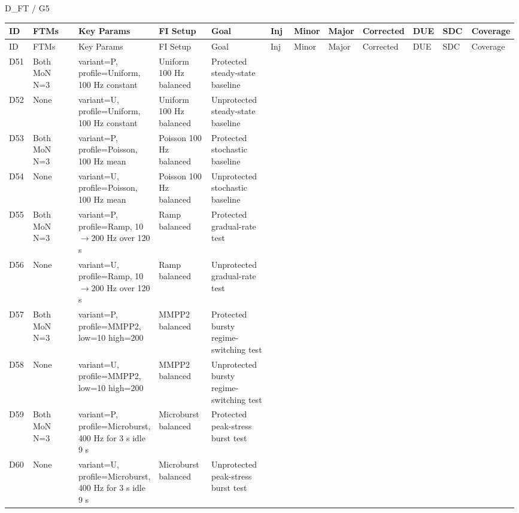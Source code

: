 D\_FT / G5

\begin{longtable}{|p{0.05\linewidth}|p{0.14\linewidth}|p{0.12\linewidth}|p{0.12\linewidth}|p{0.14\linewidth}|p{0.06\linewidth}|p{0.06\linewidth}|p{0.06\linewidth}|p{0.06\linewidth}|p{0.06\linewidth}|p{0.06\linewidth}|p{0.06\linewidth}|}
\hline
ID & FTMs & Key Params & FI Setup & Goal & Inj & Minor & Major & Corrected & DUE & SDC & Coverage \\
\hline
\endfirsthead
\hline
ID & FTMs & Key Params & FI Setup & Goal & Inj & Minor & Major & Corrected & DUE & SDC & Coverage \\
\hline
\endhead
D51 & Both MoN N=3 & variant=P, profile=Uniform, 100 Hz constant & Uniform 100 Hz \textbar{} balanced & Protected steady-state baseline &  &  &  &  &  &  &  \\
\hline
D52 & None & variant=U, profile=Uniform, 100 Hz constant & Uniform 100 Hz \textbar{} balanced & Unprotected steady-state baseline &  &  &  &  &  &  &  \\
\hline
D53 & Both MoN N=3 & variant=P, profile=Poisson, 100 Hz mean & Poisson 100 Hz \textbar{} balanced & Protected stochastic baseline &  &  &  &  &  &  &  \\
\hline
D54 & None & variant=U, profile=Poisson, 100 Hz mean & Poisson 100 Hz \textbar{} balanced & Unprotected stochastic baseline &  &  &  &  &  &  &  \\
\hline
D55 & Both MoN N=3 & variant=P, profile=Ramp, 10$\rightarrow$200 Hz over 120 s & Ramp \textbar{} balanced & Protected gradual-rate test &  &  &  &  &  &  &  \\
\hline
D56 & None & variant=U, profile=Ramp, 10$\rightarrow$200 Hz over 120 s & Ramp \textbar{} balanced & Unprotected gradual-rate test &  &  &  &  &  &  &  \\
\hline
D57 & Both MoN N=3 & variant=P, profile=MMPP2, low=10 high=200 & MMPP2 \textbar{} balanced & Protected bursty regime-switching test &  &  &  &  &  &  &  \\
\hline
D58 & None & variant=U, profile=MMPP2, low=10 high=200 & MMPP2 \textbar{} balanced & Unprotected bursty regime-switching test &  &  &  &  &  &  &  \\
\hline
D59 & Both MoN N=3 & variant=P, profile=Microburst, 400 Hz for 3 s idle 9 s & Microburst \textbar{} balanced & Protected peak-stress burst test &  &  &  &  &  &  &  \\
\hline
D60 & None & variant=U, profile=Microburst, 400 Hz for 3 s idle 9 s & Microburst \textbar{} balanced & Unprotected peak-stress burst test &  &  &  &  &  &  &  \\
\hline
\end{longtable}

